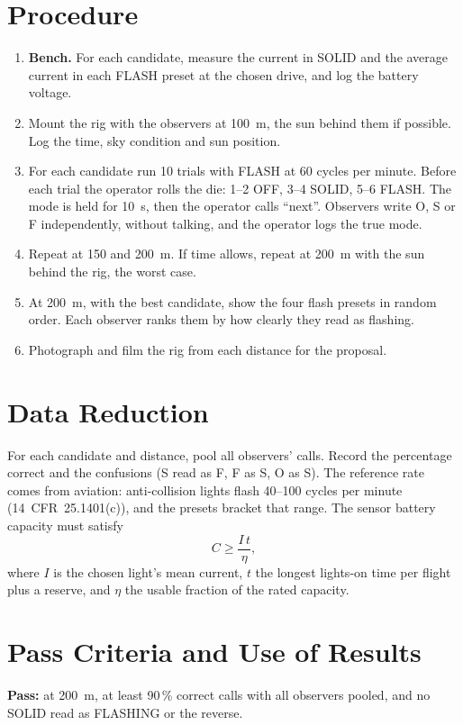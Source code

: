 \documentclass[final]{dbfdoc}
\begin{document}
\section{Procedure}
\begin{enumerate}
\item \textbf{Bench.} For each candidate, measure the current in SOLID and the average current in each FLASH preset at the chosen drive, and log the battery voltage.
\item Mount the rig with the observers at 100~m, the sun behind them if possible. Log the time, sky condition and sun position.
\item For each candidate run 10 trials with FLASH at 60 cycles per minute. Before each trial the operator rolls the die: 1--2 OFF, 3--4 SOLID, 5--6 FLASH. The mode is held for 10~s, then the operator calls ``next''. Observers write O, S or F independently, without talking, and the operator logs the true mode.
\item Repeat at 150 and 200~m. If time allows, repeat at 200~m with the sun behind the rig, the worst case.
\item At 200~m, with the best candidate, show the four flash presets in random order. Each observer ranks them by how clearly they read as flashing.
\item Photograph and film the rig from each distance for the proposal.
\end{enumerate}

\section{Data Reduction}
For each candidate and distance, pool all observers' calls. Record the percentage correct and the confusions (S read as F, F as S, O as S). The reference rate comes from aviation: anti-collision lights flash 40--100 cycles per minute (14~CFR~25.1401(c)), and the presets bracket that range. The sensor battery capacity must satisfy
\begin{equation}
C \geq \frac{I\,t}{\eta} ,
\end{equation}
where $I$ is the chosen light's mean current, $t$ the longest lights-on time per flight plus a reserve, and $\eta$ the usable fraction of the rated capacity.

\section{Pass Criteria and Use of Results}
\textbf{Pass:} at 200~m, at least 90\,\% correct calls with all observers pooled, and no SOLID read as FLASHING or the reverse.
\end{document}
